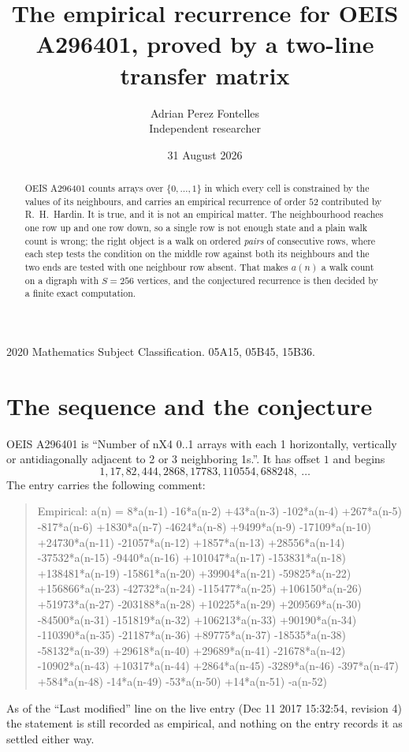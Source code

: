 \documentclass[11pt,a4paper]{article}
\title{The empirical recurrence for OEIS A296401, proved by a two-line transfer matrix}
\author{Adrian Perez Fontelles\\ \small Independent researcher}
\date{31 August 2026}
\theoremstyle{plain}
\theoremstyle{definition}
\begin{document}
\maketitle

\begin{abstract}
OEIS A296401 counts arrays over $\{0,\dots,1\}$ in which every cell is constrained by the
values of its neighbours, and carries an empirical recurrence of order $52$ contributed
by R.~H.~Hardin. It is true, and it is not an empirical matter. The neighbourhood reaches one
row up and one row down, so a single row is not enough state and a plain walk count
is wrong; the right object is a walk on ordered \emph{pairs} of consecutive rows, where
each step tests the condition on the middle row against both its neighbours and the two
ends are tested with one neighbour row absent. That makes $a(n)$ a walk count on a digraph
with $S=256$ vertices, and the conjectured recurrence is then decided by a finite exact
computation.
\end{abstract}

\noindent\small 2020 Mathematics Subject Classification. 05A15, 05B45, 15B36.\normalsize

\section{The sequence and the conjecture}

OEIS A296401 is ``Number of nX4 0..1 arrays with each 1 horizontally, vertically or antidiagonally adjacent to 2 or 3 neighboring 1s.''. It has offset $1$ and begins
\[
1, 17, 82, 444, 2868, 17783, 110554, 688248,\ \dots
\]
The entry carries the following comment:
\begin{quote}\small
Empirical: a(n) = 8*a(n-1) -16*a(n-2) +43*a(n-3) -102*a(n-4) +267*a(n-5) -817*a(n-6) +1830*a(n-7) -4624*a(n-8) +9499*a(n-9) -17109*a(n-10) +24730*a(n-11) -21057*a(n-12) +1857*a(n-13) +28556*a(n-14) -37532*a(n-15) -9440*a(n-16) +101047*a(n-17) -153831*a(n-18) +138481*a(n-19) -15861*a(n-20) +39904*a(n-21) -59825*a(n-22) +156866*a(n-23) -42732*a(n-24) -115477*a(n-25) +106150*a(n-26) +51973*a(n-27) -203188*a(n-28) +10225*a(n-29) +209569*a(n-30) -84500*a(n-31) -151819*a(n-32) +106213*a(n-33) +90190*a(n-34) -110390*a(n-35) -21187*a(n-36) +89775*a(n-37) -18535*a(n-38) -58132*a(n-39) +29618*a(n-40) +29689*a(n-41) -21678*a(n-42) -10902*a(n-43) +10317*a(n-44) +2864*a(n-45) -3289*a(n-46) -397*a(n-47) +584*a(n-48) -14*a(n-49) -53*a(n-50) +14*a(n-51) -a(n-52)
\end{quote}
As of the ``Last modified'' line on the live entry (Dec 11 2017 15:32:54, revision 4) the statement is
still recorded as empirical, and nothing on the entry records it as settled either way.
\end{document}

